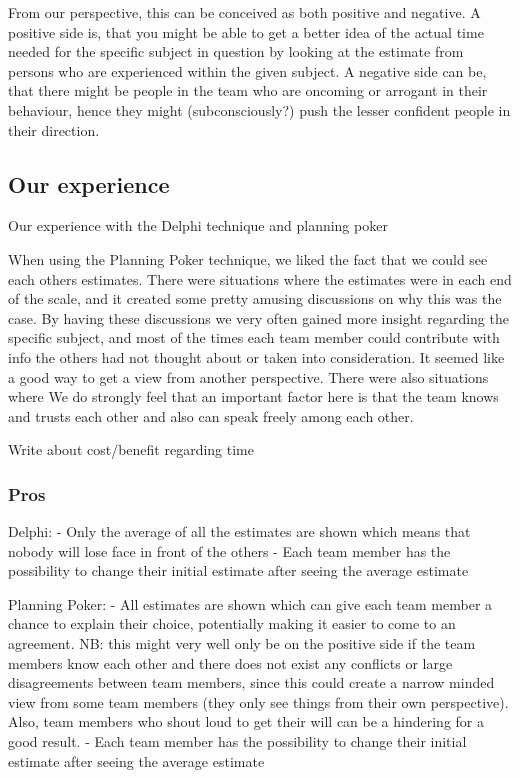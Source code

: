 From our perspective, this can be conceived as both positive and negative. A positive side is, that you might be able to get a better idea of the actual time needed for the specific subject in question by looking at the estimate from persons who are experienced within the given subject. A negative side can be, that there might be people in the team who are oncoming or arrogant in their behaviour, hence they might (subconsciously?) push the lesser confident people in their direction. 

\subsection{Our experience}

Our experience with the Delphi technique and planning poker


When using the Planning Poker technique, we liked the fact that we could see each others estimates. There were situations where the estimates were in each end of the scale, and it created some pretty amusing discussions on why this was the case. By having these discussions we very often gained more insight regarding the specific subject, and most of the times each team member could contribute with info the others had not thought about or taken into consideration. It seemed like a good way to get a view from another perspective. There were also situations where We do strongly feel that an important factor here is that the team knows and trusts each other and also can speak freely among each other.


Write about cost/benefit regarding time

\subsubsection{Pros}

Delphi: 
- Only the average of all the estimates are shown which means that nobody will lose face in front of the others
- Each team member has the possibility to change their initial estimate after seeing the average estimate

Planning Poker:
- All estimates are shown which can give each team member a chance to explain their choice, potentially making it easier to come to an agreement. NB: this might very well only be on the positive side if the team members know each other and there does not exist any conflicts or large disagreements between team members, since this could create a narrow minded view from some team members (they only see things from their own perspective). Also, team members who shout loud to get their will can be a hindering for a good result.
- Each team member has the possibility to change their initial estimate after seeing the average estimate

